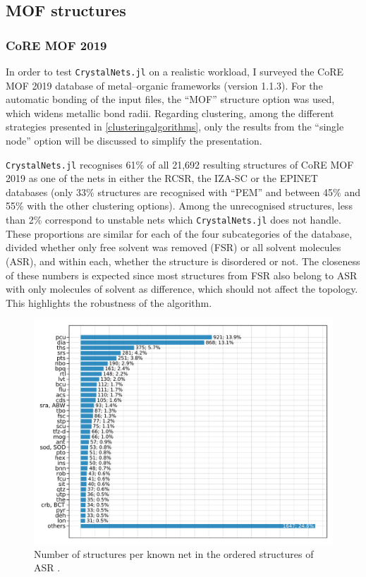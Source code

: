 \documentclass[main.tex]{subfiles}
\begin{document}


\subsection{MOF structures}

\subsubsection{CoRE MOF 2019}

In order to test \texttt{CrystalNets.jl} on a realistic workload, I surveyed the CoRE MOF 2019 \autocite{CoREMOF} database of metal--organic frameworks (version 1.1.3). For the automatic bonding of the input files, the ``MOF'' structure option was used, which widens metallic bond radii. Regarding clustering, among the different strategies presented in \cref{clusteringalgorithms}, only the results from the ``single node'' option will be discussed to simplify the presentation.

\texttt{CrystalNets.jl} recognises {61\%} of all 21,692 resulting structures of CoRE MOF 2019 as one of the nets in either the RCSR, the IZA-SC or the EPINET databases (only {33\%} structures are recognised with ``PEM'' and between {45\%} and {55\%} with the other clustering options). Among the unrecognised structures, less than {2\%} correspond to unstable nets which \texttt{CrystalNets.jl} does not handle.
These proportions are similar for each of the four subcategories of the database, divided whether only free solvent was removed (FSR) or all solvent molecules (ASR), and within each, whether the structure is disordered or not. The closeness of these numbers is expected since most structures from FSR also belong to ASR with only molecules of solvent as difference, which should not affect the topology. This highlights the robustness of the algorithm.

\begin{figure}
	\centering
	\includegraphics[width=\linewidth]{figures/topology/numstructpernet.pdf}
	\caption{Number of structures per known net in the ordered structures of ASR \autocite{CoREMOF}.}
	\label{numstructpernet}
\end{figure}
\end{document}

